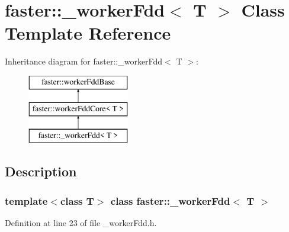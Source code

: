 \hypertarget{classfaster_1_1__workerFdd}{}\section{faster\+:\+:\+\_\+worker\+Fdd$<$ T $>$ Class Template Reference}
\label{classfaster_1_1__workerFdd}
Inheritance diagram for faster\+:\+:\+\_\+worker\+Fdd$<$ T $>$\+:\begin{figure}[H]
\begin{center}
\leavevmode
\includegraphics[height=3.000000cm]{classfaster_1_1__workerFdd}
\end{center}
\end{figure}


\subsection{Description}
\subsubsection*{template$<$class T$>$\newline
class faster\+::\+\_\+worker\+Fdd$<$ T $>$}



Definition at line 23 of file \+\_\+worker\+Fdd.\+h.

